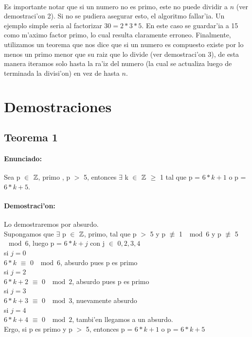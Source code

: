 \paragraph{}
Es importante notar que si un numero no es primo, este no puede dividir a $n$ (ver demostraci'on 2). Si no se pudiera asegurar esto, el algoritmo fallar'ia.
Un ejemplo simple seria al factorizar $30 = 2*3*5$. En este caso se guardar'ia a 15 como m'aximo factor primo, lo cual resulta claramente erroneo. Finalmente, utilizamos un teorema que nos dice que si un numero es compuesto existe por lo menos un primo menor que su raiz que lo divide (ver demostraci'on 3), de esta manera iteramos solo hasta la ra'iz del numero (la cual se actualiza luego de terminada la divisi'on) en vez de hasta $n$.

\section{Demostraciones}
\subsection{Teorema 1}
\paragraph{Enunciado:}
Sea p $\in$ ${\mathbb Z}$, primo , p $>$ 5, entonces $\exists$ k $\in$ ${\mathbb Z}$ $\geq$ 1  tal que p = $6*k+1$ o p = $6*k +5$.
\paragraph{Demostraci'on:}
Lo demostraremos por absurdo.\\ Supongamos que $\exists$ p $\in$ ${\mathbb Z}$, primo, tal que p $>$ 5 y p $\not\equiv$ 1  $\mod{6}$ y p
$\not\equiv$ 5  $\mod{6}$, luego p = $6*k + j$ con j $\in$ ${0,2,3,4}$ \\
si $j = 0$\\
$6*k$ $\equiv$ 0  $\mod{6}$, absurdo pues p es primo\\
si $j = 2$\\
$6*k + 2$ $\equiv$ 0  $\mod{2}$, absurdo pues p es primo \\
si $j = 3$\\
$6*k + 3$ $\equiv$ 0  $\mod{3}$, nuevamente absurdo\\
si $j = 4$\\
$6*k + 4$ $\equiv$ 0  $\mod{2}$, tambi'en llegamos a un absurdo.\\
Ergo, si p es primo y p $>$ 5, entonces p = $6*k+1$ o p = $6*k +5$

